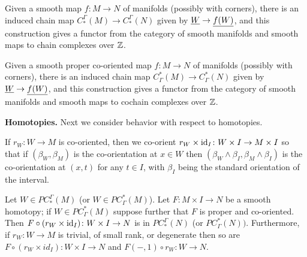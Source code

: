 \begin{corollary}
	Given a smooth map $f \colon M \to N$ of manifolds (possibly with corners), there is an induced chain map $C_*^\Gamma(M) \to C_*^\Gamma(N)$ given by $\underline{W} \to \underline{f(W)}$, and this construction gives a functor from the category of smooth manifolds and smooth maps to chain complexes over $\mathbb{Z}$.
\end{corollary}

\begin{corollary}
	Given a smooth proper co-oriented map $f \colon M \to N$ of manifolds (possibly with corners), there is an induced chain map $C^*_\Gamma(M) \to C^*_\Gamma(N)$ given by $\underline{W} \to \underline{f(W)}$, and this construction gives a functor from the category of smooth manifolds and smooth maps to cochain complexes over $\mathbb{Z}$.
\end{corollary}

\noindent\textbf{Homotopies.} Next we consider behavior with respect to homotopies.

\begin{convention}
	If $r_W \colon W \to M$ is co-oriented, then we co-orient $r_W \times \mathrm{id}_I \colon W \times I \to M \times I$ so that if $(\beta_W,\beta_M)$ is the co-orientation at $x \in W$ then $(\beta_W \wedge \beta_I,\beta_M \wedge \beta_I)$ is the co-orientation at $(x,t)$ for any $t \in I$, with $\beta_I$ being the standard orientation of the interval.
\end{convention}

\begin{lemma}\label{L: dessicated homotopy}
	Let $W \in PC_*^\Gamma(M)$ (or $W \in PC^*_\Gamma(M)$).
	Let $F \colon M \times I \to N$ be a smooth homotopy; if $W \in PC^*_\Gamma(M)$ suppose further that $F$ is proper and co-oriented.
	Then $F \circ (r_W \times \mathrm{id}_I) \colon W \times I \to N$ is in $PC_*^\Gamma(N)$ (or $PC^*_\Gamma(N))$.
	Furthermore,
	if $r_W \colon W \to M$ is trivial, of small rank, or
	degenerate then so are
	$F \circ (r_W \times id_I) \colon W \times I \to N$ and $F(-,1) \circ r_W \colon W \to N$.
\end{lemma}


